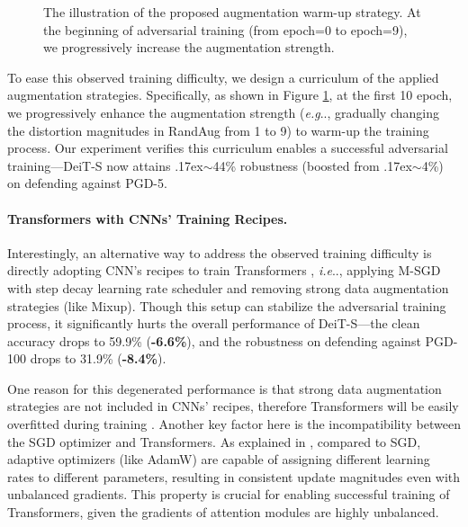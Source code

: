 \documentclass{article}
\makeatletter
\newcommand{\app}{\raise.17ex\hbox{$\scriptstyle\sim$}}
\DeclareRobustCommand\onedot{\futurelet\@let@token\@onedot}
\def\@onedot{\ifx\@let@token.\else.\null\fi\xspace}
\def\eg{\emph{e.g}\onedot} \def\Eg{\emph{E.g}\onedot}
\def\ie{\emph{i.e}\onedot} \def\Ie{\emph{I.e}\onedot}
\makeatother
\begin{document}
\begin{figure}[h!]
\centering
\caption{The illustration of the proposed augmentation warm-up strategy.  At the beginning of adversarial training (from epoch=0 to epoch=9), we progressively increase the augmentation strength.}
    \label{fig:warmupaug}
\end{figure}


To ease this observed training difficulty, we design a curriculum of the applied augmentation strategies. Specifically, as shown in  Figure \ref{fig:warmupaug}, at the first 10 epoch, we progressively enhance the augmentation strength (\eg, gradually changing the distortion magnitudes in RandAug from 1 to 9) to warm-up the training process. Our experiment verifies this curriculum enables a successful adversarial training---DeiT-S now attains \app44\% robustness (boosted from \app4\%) on defending against PGD-5.

\paragraph{Transformers with CNNs' Training Recipes.}
Interestingly, an alternative way to address the observed training difficulty is directly adopting CNN's recipes to train Transformers \cite{shao2021adversarial}, \ie, applying M-SGD with step decay learning rate scheduler and removing strong data augmentation strategies (like Mixup). Though this setup can stabilize the adversarial training process, it significantly hurts the overall performance of DeiT-S---the clean accuracy drops to 59.9\% (\textbf{-6.6\%}), and the robustness on defending against PGD-100 drops to 31.9\% (\textbf{-8.4\%}). 

One reason for this degenerated performance is that strong data augmentation strategies are not included in CNNs' recipes, therefore Transformers will be easily overfitted during training \cite{chen2021vision}. 
Another key factor here is the incompatibility between the SGD optimizer and Transformers. As explained in \cite{liu2020understanding}, compared to SGD, adaptive optimizers (like AdamW) are capable of assigning different learning rates to different parameters, resulting in consistent update magnitudes even with unbalanced gradients. This property is crucial for enabling successful training of Transformers, given the gradients of attention modules are highly unbalanced. 
\end{document}
